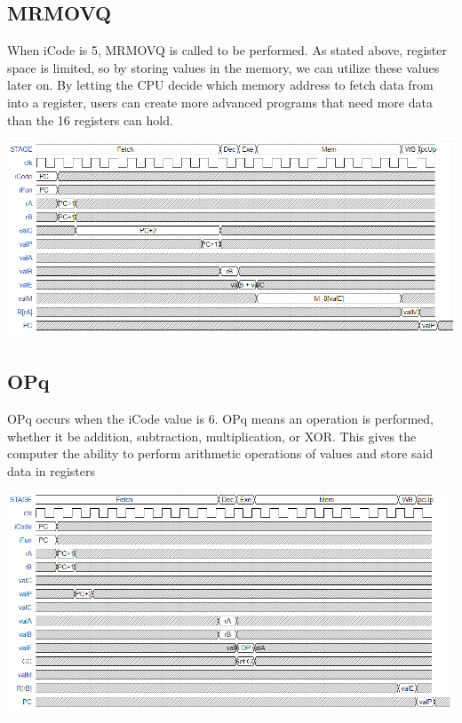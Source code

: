 \documentclass{article}
\begin{document}
\subsection{MRMOVQ}
When iCode is 5, MRMOVQ is called to be performed. As stated above, register space is limited, so by storing values in the memory, we can utilize these values later on. By letting the CPU decide which memory address to fetch data from into a register, users can create more advanced programs that need more data than the 16 registers can hold.
\begin{center}
    \includegraphics[scale=.6]{MRMOVQpic.png}
\end{center}
\subsection{OPq}
OPq occurs when the iCode value is 6. OPq means an operation is performed, whether it be addition, subtraction, multiplication, or XOR. This gives the computer the ability to perform arithmetic operations of values and store said data in registers
\begin{center}
    \includegraphics[scale=.6]{OPqpic.png}
\end{center}
\end{document}

